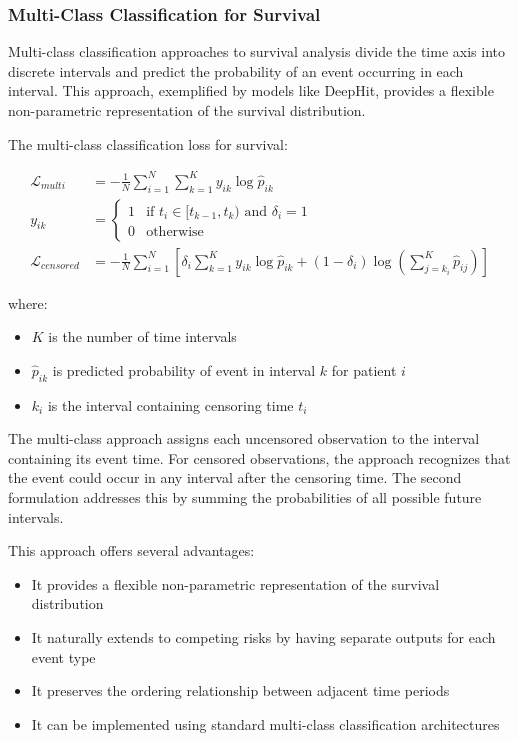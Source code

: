\subsubsection{Multi-Class Classification for Survival}

Multi-class classification approaches to survival analysis divide the time axis into discrete intervals and predict the probability of an event occurring in each interval. This approach, exemplified by models like DeepHit, provides a flexible non-parametric representation of the survival distribution.

\begin{definitionbox}[title=Multi-Class Classification for Survival]
  The multi-class classification loss for survival:

  \begin{align}
    \mathcal{L}_{multi} &= -\frac{1}{N} \sum_{i=1}^N \sum_{k=1}^K y_{ik} \log \hat{p}_{ik} \\
    y_{ik} &= \begin{cases}
      1 & \text{if } t_i \in [t_{k-1}, t_k) \text{ and } \delta_i = 1 \\
        0 & \text{otherwise}
    \end{cases} \\
    \mathcal{L}_{censored} &= -\frac{1}{N} \sum_{i=1}^N \left[ \delta_i \sum_{k=1}^K y_{ik} \log \hat{p}_{ik} + (1-\delta_i) \log \left( \sum_{j=k_i}^K \hat{p}_{ij} \right) \right]
  \end{align}

  where:
  \begin{itemize}
  \item $K$ is the number of time intervals
  \item $\hat{p}_{ik}$ is predicted probability of event in interval $k$ for patient $i$
  \item $k_i$ is the interval containing censoring time $t_i$
  \end{itemize}
\end{definitionbox}

The multi-class approach assigns each uncensored observation to the interval containing its event time. For censored observations, the approach recognizes that the event could occur in any interval after the censoring time. The second formulation addresses this by summing the probabilities of all possible future intervals.

This approach offers several advantages:
\begin{itemize}
\item It provides a flexible non-parametric representation of the survival distribution
\item It naturally extends to competing risks by having separate outputs for each event type
\item It preserves the ordering relationship between adjacent time periods
\item It can be implemented using standard multi-class classification architectures
\end{itemize}

